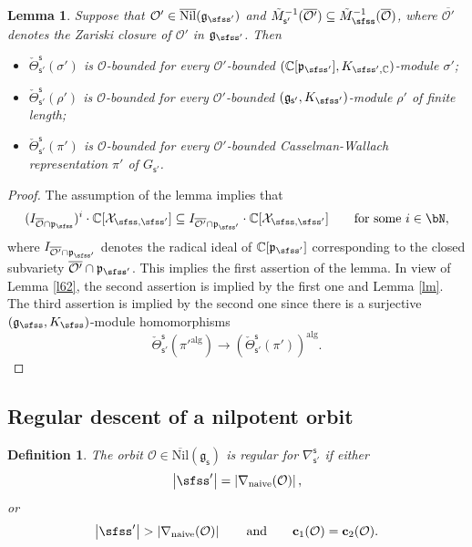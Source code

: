 \documentclass[11pt,a4paper]{amsart}
\def\abs#1{\left|{#1}\right|}
\newcommand{\CO}{{\mathcal {O}}}
\newcommand{\CX}{{\mathcal {X}}}
\newcommand{\g}{\mathfrak g}
\newcommand{\p}{\mathfrak p}
\def\DD{\nabla}
\numberwithin{equation}{section}
\newtheorem{lem}[thm]{Lemma}
\newtheorem{defn}[thm]{Definition}
\theoremstyle{remark}
\def\subset{\subseteq}
\def\Nil{\overline{\mathrm{Nil}}}
\begin{document}
\begin{lem}\label{comobound}
Suppose that $\CO'\in \Nil(\g_{\sfss'})$ and  $\tilde M_{\mathsf s'}^{-1}(\overline{\CO'})\subset \tilde M_{\sfss}^{-1}(\overline{\CO})$, where  $\overline{\CO'}$ denotes the Zariski closure of $\CO'$ in $\g_{\sfss'}$.  Then
\begin{itemize}
\item
$\check \Theta_{\mathsf s'}^{\mathsf s}(\sigma')$ is $\CO$-bounded for every $\CO'$-bounded $(\C[\p_{\sfss'}], K_{\sfss', \C})$-module $\sigma'$;
\item
 $\check \Theta_{\mathsf s'}^{\mathsf s}(\rho')$ is $\CO$-bounded for every $\CO'$-bounded $(\g_{\mathsf s'}, K_{\sfss'})$-module $\rho'$ of finite length;
 \item $\check \Theta_{\mathsf s'}^{\mathsf s}(\pi')$ is $\CO$-bounded for every $\CO'$-bounded Casselman-Wallach representation $\pi'$ of $G_{\mathsf s'}$.
 \end{itemize}
\end{lem}
\begin{proof} The assumption of the lemma implies  that
\[
 ( I_{\overline{\CO}\cap \p_\sfss})^i\cdot \C[\CX_{\sfss, \sfss'}] \subset I_{\overline{\CO'}\cap \p_{\sfss'}}\cdot  \C[\CX_{\sfss, \sfss'}]\qquad \textrm{for some } i\in \bN,
\]
where $I_{\overline{\CO'}\cap \p_{\sfss'}}$ denotes  the radical ideal of $\C[\p_{\sfss'}]$ corresponding to the closed subvariety $\overline{\CO'}\cap \p_{\sfss'}$.
This implies the first assertion of the lemma. In view of Lemma \ref{l62}, the second assertion is implied by the first one and Lemma \ref{lm}. The third assertion is implied by the second one since there is a surjective
$(\g_{\sfss}, K_{\sfss})$-module homomorphisms
\[
\check \Theta_{\mathsf s'}^{\mathsf s}(\pi'^{\mathrm{alg}})\rightarrow \left (\check \Theta_{\mathsf s'}^{\mathsf s}(\pi')\right )^{\mathrm{alg}}.
 \]
\end{proof}


\subsection{Regular descent of a nilpotent orbit}\label{regud}

\begin{defn}\label{defn:regular}
The orbit $\CO\in \Nil(\g_\mathsf s)$ is regular for $\DD_{\mathsf s'}^{\mathsf s}$ if
either
\[
\abs{\sfss'}=\abs{\DD_\mathrm{naive}(\CO)},
\]
 or
 \[
 \abs{\sfss'}>\abs{\DD_\mathrm{naive}(\CO)}\qquad\textrm{and}\qquad \mathbf c_1(\CO)=\mathbf c_2(\CO).
\]

\end{defn}
\end{document}
